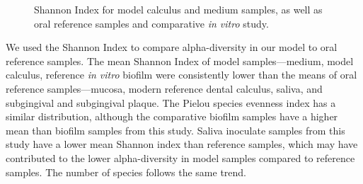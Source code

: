 \documentclass[
  b5paper,
]{book}
\begin{document}
\begin{figure}


\caption{\label{fig-shannon-compar}Shannon Index for model calculus and
medium samples, as well as oral reference samples and comparative
\emph{in vitro} study.}

\end{figure}%

We used the Shannon Index to compare alpha-diversity in our model to
oral reference samples. The mean Shannon Index of model
samples---medium, model calculus, reference \emph{in vitro} biofilm were
consistently lower than the means of oral reference samples---mucosa,
modern reference dental calculus, saliva, and subgingival and
subgingival plaque. The Pielou species evenness index has a similar
distribution, although the comparative biofilm samples have a higher
mean than biofilm samples from this study. Saliva inoculate samples from
this study have a lower mean Shannon index than reference samples, which
may have contributed to the lower alpha-diversity in model samples
compared to reference samples. The number of species follows the same
trend.
\end{document}

